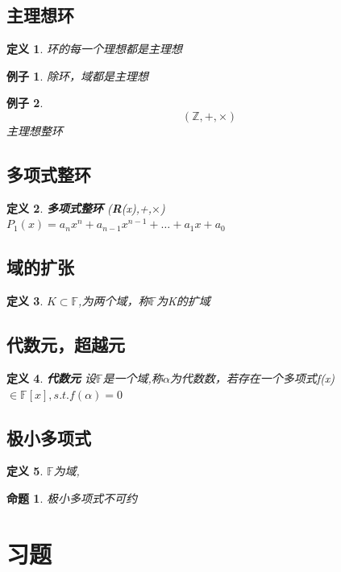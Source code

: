 \documentclass{report}
\newtheorem{proposition}[theorem]{命题}
\newtheorem{definition}{定义}
\newtheorem{example}{例子}[section]
\begin{document}
\subsection{主理想环}
\begin{definition}
环的每一个理想都是主理想
\end{definition}
\begin{example}
除环，域都是主理想
\end{example}
\begin{example}
$$(\mathbb{Z},+,\times)$$
主理想整环
\end{example}
\subsection{多项式整环}
\begin{definition}\textbf{多项式整环}
(\textbf{R}(x),+,$\times$)
\\ $P_{1}(x)=a_{n}x^{n}+a_{n-1}x^{n-1}+\dots+a_{1}x+a_{0}$

\end{definition}
\subsection{域的扩张}
\begin{definition}
$K \subset \mathbb{F}$,为两个域，称$\mathbb{F}$为K的扩域
\end{definition}
\subsection{代数元，超越元}
\begin{definition}\textbf{代数元}
设$\mathbb{F}$是一个域,称$\alpha$为代数数，若存在一个多项式f(x)$\in \mathbb{F}[x] ,s.t. f(\alpha)=0$
\end{definition}
\subsection{极小多项式}
\begin{definition}
$\mathbb{F}$为域,

\end{definition}
\begin{proposition}
极小多项式不可约
\end{proposition}
\section{习题}
\end{document}
